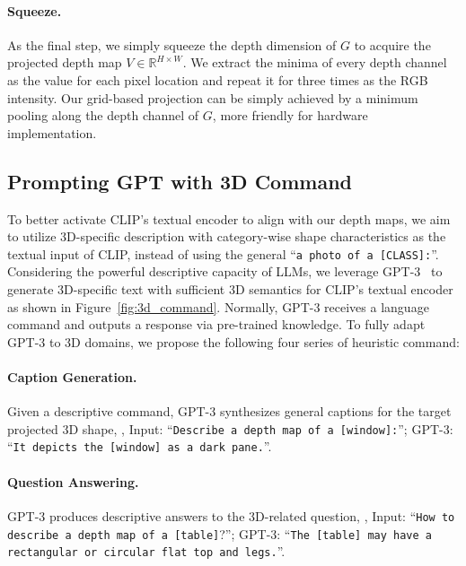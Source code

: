 \documentclass[10pt,twocolumn,letterpaper]{article}
\begin{document}
\vspace{-6pt}
\paragraph{Squeeze.} 
As the final step, we simply squeeze the depth dimension of ${G}$ to acquire the projected depth map $V \in \mathbb{R}^{H \times W}$. We extract the minima of every depth channel as the value for each pixel location and repeat it for three times as the RGB intensity. Our grid-based projection can be simply achieved by a minimum pooling along the depth channel of $G$, more friendly for hardware implementation.

\subsection{Prompting GPT with 3D Command}
\label{method:3D_prompt}

To better activate CLIP's textual encoder to align with our depth maps, we aim to utilize 3D-specific description with category-wise shape characteristics as the textual input of CLIP, instead of using the general ``\texttt{a photo of a [CLASS]:}''. Considering the powerful descriptive capacity of LLMs, we leverage GPT-3~\cite{brown2020language} to generate 3D-specific text with sufficient 3D semantics for CLIP's textual encoder as shown in Figure~\ref{fig:3d_command}. Normally, GPT-3 receives a language command and outputs a response via pre-trained knowledge. To fully adapt GPT-3 to 3D domains, we propose the following four series of heuristic command:

\vspace{-6pt}
\paragraph{Caption Generation.} 
Given a descriptive command, GPT-3 synthesizes general captions for the target projected 3D shape, \eg, Input: ``\texttt{Describe a depth map of a {[window]}:}''; GPT-3: ``\texttt{It depicts the {[window]} as a dark pane.}''.

\vspace{-6pt}
\paragraph{Question Answering.} 
GPT-3 produces descriptive answers to the 3D-related question, \eg, Input: ``\texttt{How to describe a depth map of a [table]}?''; GPT-3: ``\texttt{The {[table]} may have a rectangular or circular flat top and legs.}''.
\end{document}
